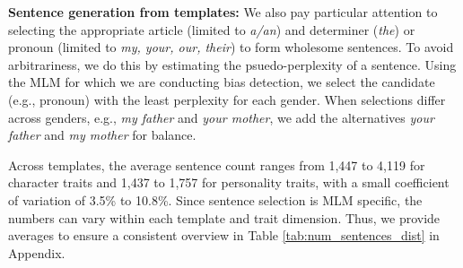 \vspace{0.5em}
\noindent\textbf{Sentence generation from templates:}  We also pay particular attention to selecting the appropriate article (limited to \textit{a/an}) and determiner (\textit{the}) or pronoun (limited to \textit{my, your, our, their}) to form wholesome sentences. 
%
To avoid arbitrariness, we do this by estimating the psuedo-perplexity of a sentence. Using the MLM for which we are conducting bias detection, we select the candidate (e.g., pronoun) with the least perplexity for each gender.
%
When selections differ across genders, e.g., \textit{my father} and \textit{your mother}, we add the alternatives \textit{your father} and \textit{my mother} for balance. 

 
Across templates, the average sentence count ranges from 1,447 to 4,119 for character traits and 1,437 to 1,757 for personality traits, with a small coefficient of variation 
of 3.5\% to 10.8\%. Since sentence selection is MLM specific, the numbers can vary within each template and trait dimension.  Thus, we provide averages to ensure a consistent overview in Table \ref{tab:num_sentences_dist} in Appendix.

